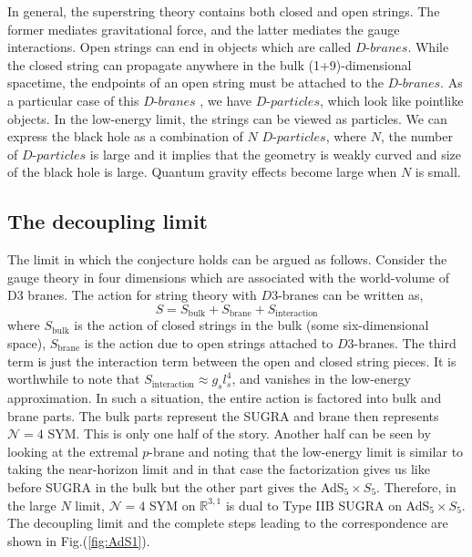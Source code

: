 In general, the superstring theory contains both closed and open strings. 
The former mediates gravitational force, and the latter mediates the gauge interactions. 
Open strings can end in objects which are called $\textit{D-branes}$. 
While the closed string can propagate anywhere in the bulk (1+9)-dimensional spacetime, 
the endpoints of an open string must be attached to the $\textit{D-branes}$.  
As a particular case of this $\textit{D-branes }$, we have $\textit{D-particles}$, 
which look like pointlike objects. In the low-energy limit, the strings can be
 viewed as particles. We can express the black hole as a combination of 
 $N$ $\textit{D-particles}$, 
where $N$, the number of $\textit{D-particles}$ is large and it implies that 
the geometry is weakly curved and size of the black hole is large. Quantum gravity effects become
large when $N$ is small. 

\subsection{The decoupling limit} 

The limit in which the conjecture holds can be argued as follows. 
Consider the gauge theory in four dimensions which are associated 
with the world-volume of D3 branes. 
The action for string theory with $D3$-branes 
can be written as, 
\begin{equation}
S = S_{\text{bulk}} + S_{\text{brane}}  + S_{\text{interaction}} 
\end{equation}
where $ S_{\text{bulk}}$ is the action of closed strings in the bulk (some six-dimensional space), 
$S_{\text{brane}}$ is the action due to open strings attached to 
$D3$-branes. The third term is just the interaction term between
the open and closed string pieces. It is worthwhile to note that 
$S_{\text{interaction}} \approx g_{s} l_{s}^4$, and vanishes
in the low-energy approximation. In such a situation, the entire 
action is factored into bulk and brane parts. 
The bulk parts represent the SUGRA and brane then represents 
$\mathcal{N}=4$ SYM. 
This is only one half of the story. Another half can be seen by 
looking at the extremal $p$-brane 
and noting that the low-energy limit is similar to taking the 
near-horizon limit and in that case the 
factorization gives us like before SUGRA in the bulk
but the other part gives the AdS$_5 \times S_5$.
Therefore, in the large $N$ limit, $\mathcal{N}=4$ SYM on $\mathbb{R}^{3,1}$ is dual to 
Type IIB SUGRA on AdS$_5 \times S_5$.
The decoupling limit and the complete steps leading to the 
correspondence are shown in Fig.(\ref{fig:AdS1}). 

